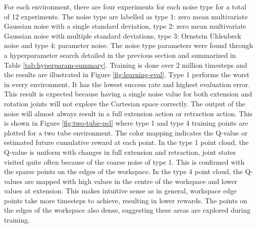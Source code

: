 For each environment, there are four experiments for each noise type for a total of 12 experiments. The noise type are labelled as  type 1: zero mean multivariate Gaussian noise with a single standard deviation, type 2: zero mean multivariate Gaussian noise with multiple standard deviations, type 3: Ornstein Uhlenbeck noise and type 4: parameter noise. The noise type parameters were found through a hyperparameter search detailed in the previous section and summarized in Table \ref{tab:hyperparam-summary}. Training is done over 2 million timesteps and the results are illustrated in Figure \ref{fig:learning-eval}. Type 1 performs the worst in every environment. It has the lowest success rate and highest evaluation error. This result is expected because having a single noise value for both extension and rotation joints will not explore the Cartesian space correctly. The output of the noise will almost always result in a full extension action or retraction action. This is shown in Figure \ref{fig:two-tube-pcl} where type 1 and type 4 training points are plotted for a two tube environment. The color mapping indicates the Q-value or estimated future cumulative reward at each point. In the type 1 point cloud, the Q-value is uniform with changes in full extension and retraction, joint states visited quite often because of the coarse noise of type 1. This is confirmed with the sparse points on the edges of the workspace. In the type 4 point cloud, the Q-values are mapped with high values in the centre of the workspace and lower values at extension. This makes intuitive sense as in general, workspace edge points take more timesteps to achieve, resulting in lower rewards. The points on the edges of the workspace also dense, suggesting these areas are explored during training.

